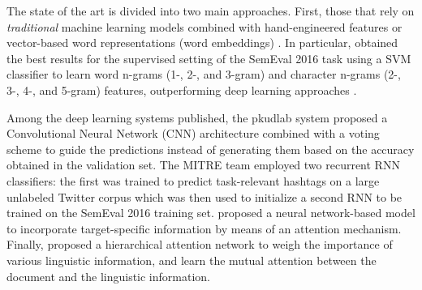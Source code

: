\documentclass[10pt, a4paper]{article}
\begin{document}

The state of the art is divided into two main approaches. First, those that rely on \emph{traditional} machine learning models combined with hand-engineered features \cite{Mohammad:2017:SST:3106680.3003433} or vector-based word representations (word embeddings) \cite{bohler-etal-2016-idi}. In particular, \cite{Mohammad:2017:SST:3106680.3003433} obtained the best results for the supervised setting of the SemEval 2016 task using a SVM classifier to learn word n-grams (1-, 2-, and 3-gram) and character n-grams (2-, 3-, 4-, and 5-gram) features, outperforming deep learning approaches \cite{zarrella-marsh-2016-mitre,wei-etal-2016-pkudblab}.

Among the deep learning systems published, the pkudlab system \cite{wei-etal-2016-pkudblab} proposed a Convolutional Neural Network (CNN) architecture combined with a voting scheme to guide the predictions instead of generating them based on the accuracy obtained in the validation set. The MITRE team \cite{zarrella-marsh-2016-mitre} employed two recurrent RNN classifiers: the first was trained to predict task-relevant hashtags on a large unlabeled Twitter corpus which was then used to initialize a second RNN to be trained on the SemEval 2016 training set. \cite{du2017stance} proposed a neural network-based model to incorporate target-specific information by means of an attention mechanism. Finally, \cite{sun-etal-2018-stance} proposed a hierarchical attention network to weigh the importance of various linguistic information, and learn the mutual attention between the document and the linguistic information.
\end{document}
